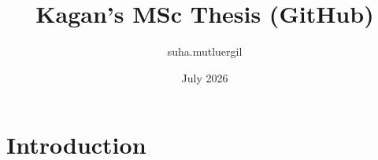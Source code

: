 \documentclass{article}
\title{Kagan's MSc Thesis (GitHub)}
\author{suha.mutluergil }
\date{July 2026}
\begin{document}
\maketitle

\section{Introduction}
\end{document}
